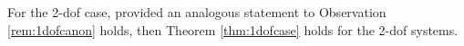 


\begin{observation*}
\label{obs:2dof_case}
    For the 2-dof case, provided an analogous statement to Observation \ref{rem:1dofcanon} holds, then Theorem \ref{thm:1dofcase} holds for the 2-dof  systems.
\end{observation*}




